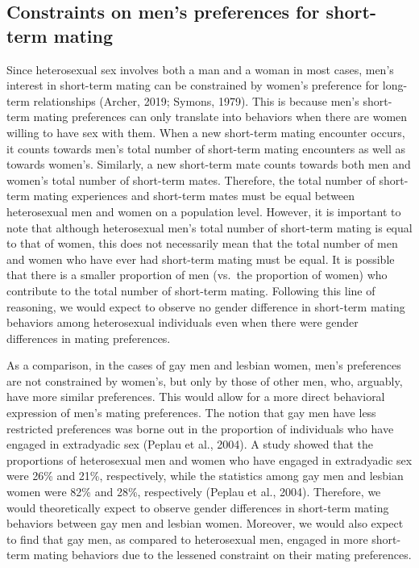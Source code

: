 \documentclass[
  11pt,
]{article}
\begin{document}
\hypertarget{constraints-on-mens-preferences-for-short-term-mating}{%
\subsection{Constraints on men's preferences for short-term
mating}\label{constraints-on-mens-preferences-for-short-term-mating}}

Since heterosexual sex involves both a man and a woman in most cases,
men's interest in short-term mating can be constrained by women's
preference for long-term relationships (Archer, 2019; Symons, 1979).
This is because men's short-term mating preferences can only translate
into behaviors when there are women willing to have sex with them. When
a new short-term mating encounter occurs, it counts towards men's total
number of short-term mating encounters as well as towards women's.
Similarly, a new short-term mate counts towards both men and women's
total number of short-term mates. Therefore, the total number of
short-term mating experiences and short-term mates must be equal between
heterosexual men and women on a population level. However, it is
important to note that although heterosexual men's total number of
short-term mating is equal to that of women, this does not necessarily
mean that the total number of men and women who have ever had short-term
mating must be equal. It is possible that there is a smaller proportion
of men (vs.~the proportion of women) who contribute to the total number
of short-term mating. Following this line of reasoning, we would expect
to observe no gender difference in short-term mating behaviors among
heterosexual individuals even when there were gender differences in
mating preferences.

As a comparison, in the cases of gay men and lesbian women, men's
preferences are not constrained by women's, but only by those of other
men, who, arguably, have more similar preferences. This would allow for
a more direct behavioral expression of men's mating preferences. The
notion that gay men have less restricted preferences was borne out in
the proportion of individuals who have engaged in extradyadic sex
(Peplau et al., 2004). A study showed that the proportions of
heterosexual men and women who have engaged in extradyadic sex were 26\%
and 21\%, respectively, while the statistics among gay men and lesbian
women were 82\% and 28\%, respectively (Peplau et al., 2004). Therefore,
we would theoretically expect to observe gender differences in
short-term mating behaviors between gay men and lesbian women. Moreover,
we would also expect to find that gay men, as compared to heterosexual
men, engaged in more short-term mating behaviors due to the lessened
constraint on their mating preferences.
\end{document}
